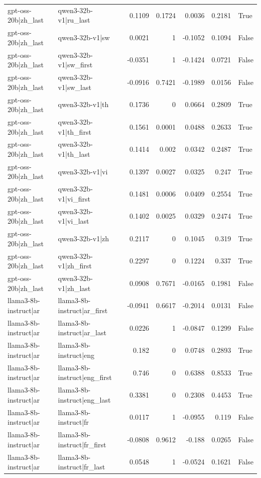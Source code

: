 \begin{table}
\begin{tabular}{l l r r r r l}
gpt-oss-20b|zh_last & qwen3-32b-v1|ru_last & 0.1109 & 0.1724 & 0.0036 & 0.2181 & True \\
gpt-oss-20b|zh_last & qwen3-32b-v1|sw & 0.0021 & 1 & -0.1052 & 0.1094 & False \\
gpt-oss-20b|zh_last & qwen3-32b-v1|sw_first & -0.0351 & 1 & -0.1424 & 0.0721 & False \\
gpt-oss-20b|zh_last & qwen3-32b-v1|sw_last & -0.0916 & 0.7421 & -0.1989 & 0.0156 & False \\
gpt-oss-20b|zh_last & qwen3-32b-v1|th & 0.1736 & 0 & 0.0664 & 0.2809 & True \\
gpt-oss-20b|zh_last & qwen3-32b-v1|th_first & 0.1561 & 0.0001 & 0.0488 & 0.2633 & True \\
gpt-oss-20b|zh_last & qwen3-32b-v1|th_last & 0.1414 & 0.002 & 0.0342 & 0.2487 & True \\
gpt-oss-20b|zh_last & qwen3-32b-v1|vi & 0.1397 & 0.0027 & 0.0325 & 0.247 & True \\
gpt-oss-20b|zh_last & qwen3-32b-v1|vi_first & 0.1481 & 0.0006 & 0.0409 & 0.2554 & True \\
gpt-oss-20b|zh_last & qwen3-32b-v1|vi_last & 0.1402 & 0.0025 & 0.0329 & 0.2474 & True \\
gpt-oss-20b|zh_last & qwen3-32b-v1|zh & 0.2117 & 0 & 0.1045 & 0.319 & True \\
gpt-oss-20b|zh_last & qwen3-32b-v1|zh_first & 0.2297 & 0 & 0.1224 & 0.337 & True \\
gpt-oss-20b|zh_last & qwen3-32b-v1|zh_last & 0.0908 & 0.7671 & -0.0165 & 0.1981 & False \\
llama3-8b-instruct|ar & llama3-8b-instruct|ar_first & -0.0941 & 0.6617 & -0.2014 & 0.0131 & False \\
llama3-8b-instruct|ar & llama3-8b-instruct|ar_last & 0.0226 & 1 & -0.0847 & 0.1299 & False \\
llama3-8b-instruct|ar & llama3-8b-instruct|eng & 0.182 & 0 & 0.0748 & 0.2893 & True \\
llama3-8b-instruct|ar & llama3-8b-instruct|eng_first & 0.746 & 0 & 0.6388 & 0.8533 & True \\
llama3-8b-instruct|ar & llama3-8b-instruct|eng_last & 0.3381 & 0 & 0.2308 & 0.4453 & True \\
llama3-8b-instruct|ar & llama3-8b-instruct|fr & 0.0117 & 1 & -0.0955 & 0.119 & False \\
llama3-8b-instruct|ar & llama3-8b-instruct|fr_first & -0.0808 & 0.9612 & -0.188 & 0.0265 & False \\
llama3-8b-instruct|ar & llama3-8b-instruct|fr_last & 0.0548 & 1 & -0.0524 & 0.1621 & False \\

\end{tabular}
\end{table}
